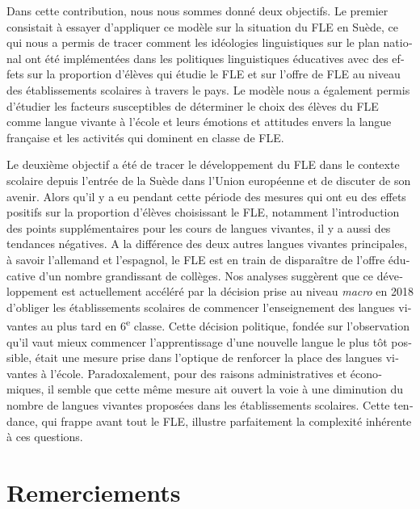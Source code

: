 \documentclass[french, output=paper]{langscibook}
\begin{document}
\begin{otherlanguage}{french}
Dans cette contribution, nous nous sommes donné deux objectifs. Le premier consistait à essayer d’appliquer ce modèle sur la situation du FLE en Suède, ce qui nous a permis de tracer comment les idéologies linguistiques sur le plan national ont été implémentées dans les politiques linguistiques éducatives avec des effets sur la proportion d’élèves qui étudie le FLE et sur l’offre de FLE au niveau des établissements scolaires à travers le pays. Le modèle nous a également permis d’étudier les facteurs susceptibles de déterminer le choix des élèves du FLE comme langue vivante à l’école et leurs émotions et attitudes envers la langue française et les activités qui dominent en classe de FLE. 

Le deuxième objectif a été de tracer le développement du FLE dans le contexte scolaire depuis l’entrée de la Suède dans l’Union européenne et de discuter de son avenir. Alors qu’il y a eu pendant cette période des mesures qui ont eu des effets positifs sur la proportion d’élèves choisissant le FLE, notamment l’introduction des points supplémentaires pour les cours de langues vivantes, il y a aussi des tendances négatives. A la différence des deux autres langues vivantes principales, à savoir l’allemand et l’espagnol, le FLE est en train de disparaître de l’offre éducative d’un nombre grandissant de collèges. Nos analyses suggèrent que ce développement est actuellement accéléré par la décision prise au niveau \textit{macro} en 2018 d’obliger les établissements scolaires de commencer l’enseignement des langues vivantes au plus tard en 6\textsuperscript{e} classe. Cette décision politique, fondée sur l’observation qu’il vaut mieux commencer l’apprentissage d’une nouvelle langue le plus tôt possible, était une mesure prise dans l’optique de renforcer la place des langues vivantes à l’école. Paradoxalement, pour des raisons administratives et économiques, il semble que cette même mesure ait ouvert la voie à une diminution du nombre de langues vivantes proposées dans les établissements scolaires. Cette tendance, qui frappe avant tout le FLE, illustre parfaitement la complexité inhérente à ces questions.

\section*{Remerciements} 


\end{otherlanguage}
\end{document}
